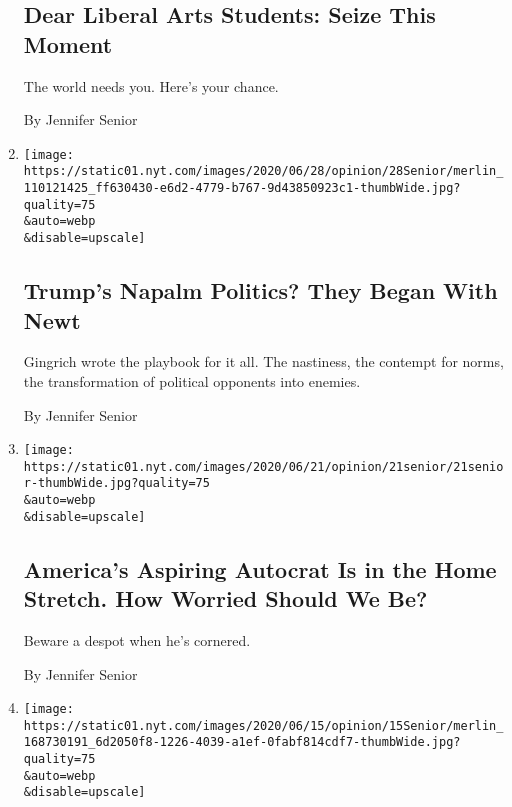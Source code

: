 \begin{enumerate}
  \hypertarget{dear-liberal-arts-students-seize-this-moment}{%
  \subsection{Dear Liberal Arts Students: Seize This
  Moment}\label{dear-liberal-arts-students-seize-this-moment}}

  The world needs you. Here's your chance.

  By Jennifer Senior
\item
  \href{/2020/06/28/opinion/trump-newt-gingrich.html}{}

  \texttt{[image: https://static01.nyt.com/images/2020/06/28/opinion/28Senior/merlin\_110121425\_ff630430-e6d2-4779-b767-9d43850923c1-thumbWide.jpg?quality=75\\\&auto=webp\\\&disable=upscale]}

  \hypertarget{trumps-napalm-politics-they-began-with-newt}{%
  \subsection{Trump's Napalm Politics? They Began With
  Newt}\label{trumps-napalm-politics-they-began-with-newt}}

  Gingrich wrote the playbook for it all. The nastiness, the contempt
  for norms, the transformation of political opponents into enemies.

  By Jennifer Senior
\item
  \href{/2020/06/21/opinion/trump-autocrat-barr.html}{}

  \texttt{[image: https://static01.nyt.com/images/2020/06/21/opinion/21senior/21senior-thumbWide.jpg?quality=75\\\&auto=webp\\\&disable=upscale]}

  \hypertarget{americas-aspiring-autocrat-is-in-the-home-stretch-how-worried-should-we-be}{%
  \subsection{America's Aspiring Autocrat Is in the Home Stretch. How
  Worried Should We
  Be?}\label{americas-aspiring-autocrat-is-in-the-home-stretch-how-worried-should-we-be}}

  Beware a despot when he's cornered.

  By Jennifer Senior
\item
  \href{/2020/06/14/opinion/layoffs-coronavirus-economy.html}{}

  \texttt{[image: https://static01.nyt.com/images/2020/06/15/opinion/15Senior/merlin\_168730191\_6d2050f8-1226-4039-a1ef-0fabf814cdf7-thumbWide.jpg?quality=75\\\&auto=webp\\\&disable=upscale]}


\end{enumerate}
